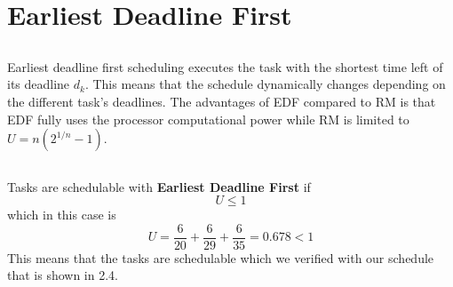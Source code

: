 \documentclass[12pt,a4paper]{article}
\begin{document}

\section{Earliest Deadline First}
\subsection{}
Earliest deadline first scheduling executes the task with the shortest
time left of its deadline $d_k$. This means that the schedule
dynamically changes depending on the different task's deadlines. The
advantages of EDF compared to RM is that EDF fully uses the processor
computational power while RM is limited to $U=n(2^{1/n}-1)$.

\subsection{} %
Tasks are schedulable with \textbf{Earliest Deadline First} if 
\begin{equation}
U \le 1
\end{equation}
which in this case is
\begin{equation}
  U = \frac{6}{20}+\frac{6}{29}+\frac{6}{35}=0.678 < 1
\end{equation}
This means that the tasks are schedulable which we verified with our schedule that is shown in 2.4.
\end{document}
